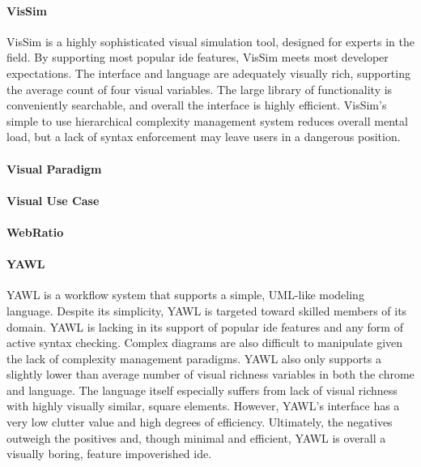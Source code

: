 \paragraph{VisSim} VisSim is a highly sophisticated visual simulation tool,
designed for experts in the field. By supporting most popular \ac{ide}
features, VisSim meets most developer expectations. The interface and
language are adequately visually rich, supporting the average count of four
visual variables. The large library of functionality is conveniently
searchable, and overall the interface is highly efficient. VisSim's simple
to use hierarchical complexity management system reduces overall mental
load, but a lack of syntax enforcement may leave users in a dangerous
position.

\paragraph{Visual Paradigm}

\paragraph{Visual Use Case}

\paragraph{WebRatio}

\paragraph{YAWL} YAWL is a workflow system that supports a simple, UML-like
modeling language. Despite its simplicity, YAWL is targeted toward skilled
members of its domain. YAWL is lacking in its support of popular \ac{ide}
features and any form of active syntax checking. Complex diagrams are also
difficult to manipulate given the lack of complexity management paradigms.
YAWL also only supports a slightly lower than average number of visual
richness variables in both the chrome and language. The language itself
especially suffers from lack of visual richness with highly visually
similar, square elements. However, YAWL's interface has a very low clutter
value and high degrees of efficiency. Ultimately, the negatives outweigh
the positives and, though minimal and efficient, YAWL is overall a visually
boring, feature impoverished \ac{ide}.
